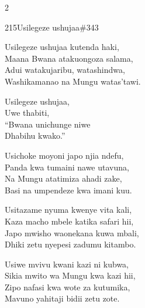 \begin{multicols}{2}
\begin{hymn}{215}{Usilegeze ushujaa}{\#343}
\begin{stanza}
Usilegeze ushujaa kutenda haki,\\
Maana Bwana atakuongoza salama,\\
Adui watakujaribu, watashindwa,\\
Washikamanao na Mungu watas'tawi.
\end{stanza}
\begin{chorus}
Usilegeze ushujaa,\\
Uwe thabiti,\\
``Bwana unichunge niwe\\
Dhabihu kwako.''
\end{chorus}
\begin{stanza}
Usichoke moyoni japo njia ndefu,\\
Panda kwa tumaini nawe utavuna,\\
Na Mungu atatimiza ahadi zake,\\
Basi na umpendeze kwa imani kuu.
\end{stanza}
\begin{stanza}
Usitazame nyuma kwenye vita kali,\\
Kaza macho mbele katika safari hii,\\
Japo mwisho waonekana kuwa mbali,\\
Dhiki zetu nyepesi zadumu kitambo.
\end{stanza}
\begin{stanza}
Usiwe mvivu kwani kazi ni kubwa,\\
Sikia mwito wa Mungu kwa kazi hii,\\
Zipo nafasi kwa wote za kutumika,\\
Mavuno yahitaji bidii zetu zote.
\end{stanza}
\end{hymn}


\end{multicols}
